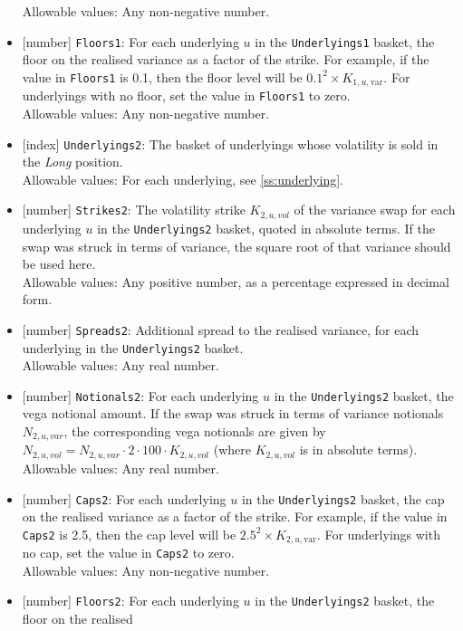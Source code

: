 \begin{itemize}
  Allowable values: Any non-negative number.
  \item{}[number] \lstinline!Floors1!: For each underlying $u$ in the \lstinline!Underlyings1! basket, the floor on the realised
  variance as a factor of the strike. For example, if the value in \lstinline!Floors1! is 0.1, then the floor level will
  be $0.1^2 \times K_{1,u,\text{var}}$. For underlyings with no floor, set the value in \lstinline!Floors1! to zero. \\
  Allowable values: Any non-negative number.
  \item{}[index] \lstinline!Underlyings2!: The basket of underlyings whose volatility is sold in the \emph{Long} position.\\
  Allowable values: For each underlying, see \ref{ss:underlying}.
  \item{}[number] \lstinline!Strikes2!: The volatility strike $K_{2,u,vol}$ of the variance swap for each underlying $u$
  in the \lstinline!Underlyings2! basket, quoted in absolute terms. If the swap was
  struck in terms of variance, the square root of that variance should be used here.\\
  Allowable values: Any positive number, as a percentage expressed in decimal form.
  \item{}[number] \lstinline!Spreads2!: Additional spread to the realised variance, for each underlying in the
  \lstinline!Underlyings2! basket. \\
  Allowable values: Any real number.
  \item{}[number] \lstinline!Notionals2!: For each underlying $u$ in the \lstinline!Underlyings2! basket, the vega notional amount.
  If the swap was struck in terms of variance notionals $N_{2,u,var}$, the corresponding vega notionals are given by
  $N_{2,u,vol} = N_{2,u,var} \cdot 2 \cdot 100 \cdot K_{2,u,vol}$ (where $K_{2,u,vol}$ is in
  absolute terms). \\
  Allowable values: Any real number.
  \item{}[number] \lstinline!Caps2!: For each underlying $u$ in the \lstinline!Underlyings2! basket, the cap on the realised variance
  as a factor of the strike. For example, if the value in  \lstinline!Caps2! is 2.5, then the cap level will be
  $2.5^2 \times K_{2,u,\text{var}}$. For underlyings with no cap, set the value in \lstinline!Caps2! to zero. \\
  Allowable values: Any non-negative number.
  \item{}[number] \lstinline!Floors2!: For each underlying $u$ in the \lstinline!Underlyings2! basket, the floor on the realised

\end{itemize}
